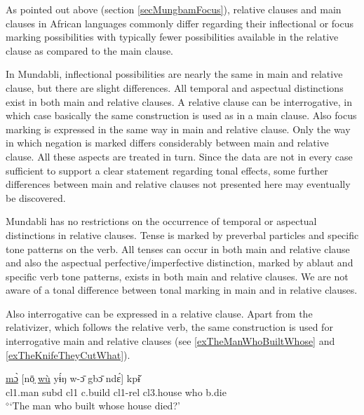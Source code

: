 \documentclass[10pt,twoside]{article}
\def\ci#1{{\ipaFont #1}}
\newcommand{\gl}[1]{`#1'}
\def\VSP{\vspace{0pt}}
\newcommand{\cl}[1]{{\sc cl#1}}
\def\elicited{$^\diamond$}
\begin{document}
As pointed out above (section \ref{secMungbamFocus}), relative clauses and main clauses in African languages commonly 
differ regarding their inflectional or focus marking possibilities with typically fewer possibilities available in 
the relative clause as compared to the main clause.

In Mundabli, inflectional possibilities are nearly the same in main and relative clause, but there are 
slight differences. All temporal and aspectual distinctions exist in both main and relative clauses. A relative 
clause can be interrogative, in which case basically the same construction is used as in a main clause. 
Also focus marking is expressed in the same way in main and relative clause. Only the way in which negation 
is marked differs considerably between main and relative clause. All these aspects are treated in turn. 
Since the 
data are not in every case sufficient to support a clear statement regarding tonal effects,
some further differences between main and relative clauses not presented here may eventually be
discovered.

Mundabli has no restrictions on the occurrence of temporal or aspectual distinctions in relative clauses. Tense is marked by preverbal particles and specific tone patterns on the verb. All tenses can occur in both main and relative clause and also the aspectual perfective/imperfective distinction, marked by ablaut and specific verb tone patterns, exists in both main and relative clauses. We are not aware of a tonal difference between tonal marking in main and in relative clauses. 

Also interrogative can be expressed in a relative clause. Apart from the relativizer, which follows the relative verb, the same construction is 
used for interrogative main and relative clauses (see \ref{exTheManWhoBuiltWhose} and \ref{exTheKnifeTheyCutWhat}).

\begin{exe} 
	\ex \label{exTheManWhoBuiltWhose}	

		\gll \uline{mɔ̀} [nō̤ \uline{wù} yɨ́ŋ w-ɔ̄ gbɔ̄ ndɛ́] kpɨ̌			\\
		\cl1.man {\sc subd} \cl1  c.build \cl1-{\sc rel} \cl3.house who b.die	\\
		\glt \VSP \elicited \gl{The man who built whose house died?}

\end{exe}%
\end{document}
